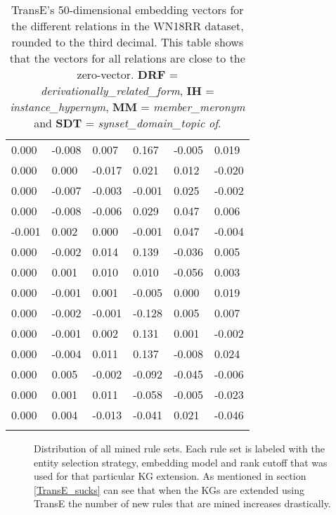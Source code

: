 \begin{longtable}{llllll}
0.000        & -0.008             & 0.007             & 0.167       & -0.005      & 0.019        \\
0.000        & 0.000              & -0.017            & 0.021       & 0.012       & -0.020       \\
0.000        & -0.007             & -0.003            & -0.001      & 0.025       & -0.002       \\
0.000        & -0.008             & -0.006            & 0.029       & 0.047       & 0.006        \\
-0.001       & 0.002              & 0.000             & -0.001      & 0.047       & -0.004       \\
0.000        & -0.002             & 0.014             & 0.139       & -0.036      & 0.005        \\
0.000        & 0.001              & 0.010             & 0.010       & -0.056      & 0.003        \\
0.000        & -0.001             & 0.001             & -0.005      & 0.000       & 0.019        \\
0.000        & -0.002             & -0.001            & -0.128      & 0.005       & 0.007        \\
0.000        & -0.001             & 0.002             & 0.131       & 0.001       & -0.002       \\
0.000        & -0.004             & 0.011             & 0.137       & -0.008      & 0.024        \\
0.000        & 0.005              & -0.002            & -0.092      & -0.045      & -0.006       \\
0.000        & 0.001              & 0.011             & -0.058      & -0.005      & -0.023       \\
0.000        & 0.004              & -0.013            & -0.041      & 0.021       & -0.046      \\ \hline
\caption{TransE's 50-dimensional embedding vectors for the different relations in the WN18RR dataset, rounded to the third decimal. This table shows that the vectors for all relations are close to the zero-vector. \textbf{DRF} = \textit{derivationally\_related\_form}, \textbf{IH} = \textit{instance\_hypernym}, \textbf{MM} = \textit{member\_meronym} and \textbf{SDT} = \textit{synset\_domain\_topic of}.}
\label{TransE_embedding_WN18RR}
\end{longtable}

\begin{figure}[htbp]
\centering
    \centering
    
    \caption[Dist. of all sets of mined rules.]{Distribution of all mined rule sets. Each rule set is labeled with the entity selection strategy, embedding model and rank cutoff that was used for that particular KG extension. As mentioned in section \ref{TransE_sucks} can see that when the KGs are extended using TransE the number of new rules that are mined increases drastically.}
    \label{all_sets}
\end{figure}


